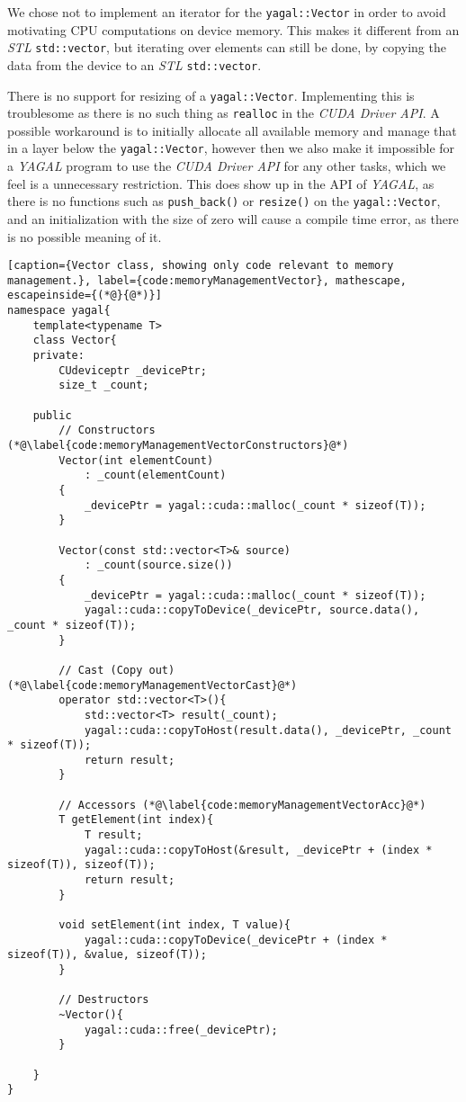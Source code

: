 We chose not to implement an iterator for the \texttt{yagal::Vector} in order to avoid motivating CPU computations on device memory. This makes it different from an \textit{STL} \texttt{std::vector}, but iterating over elements can still be done, by copying the data from the device to an \textit{STL} \texttt{std::vector}.

There is no support for resizing of a \texttt{yagal::Vector}. Implementing this is troublesome as there is no such thing as \texttt{realloc} in the \textit{CUDA Driver API}. A possible workaround is to initially allocate all available memory and manage that in a layer below the \texttt{yagal::Vector}, however then we also make it impossible for a \textit{YAGAL} program to use the \textit{CUDA Driver API} for any other tasks, which we feel is a unnecessary restriction. This does show up in the API of \textit{YAGAL}, as there is no functions such as \texttt{push\_back()} or \texttt{resize()} on the \texttt{yagal::Vector}, and an initialization with the size of zero will cause a compile time error, as there is no possible meaning of it.

\begin{lstlisting}[caption={Vector class, showing only code relevant to memory management.}, label={code:memoryManagementVector}, mathescape, escapeinside={(*@}{@*)}]
namespace yagal{
    template<typename T>
    class Vector{
    private:
        CUdeviceptr _devicePtr;
        size_t _count;

    public
        // Constructors (*@\label{code:memoryManagementVectorConstructors}@*)
        Vector(int elementCount)
            : _count(elementCount)
        {
            _devicePtr = yagal::cuda::malloc(_count * sizeof(T));
        }

        Vector(const std::vector<T>& source)
            : _count(source.size())
        {
            _devicePtr = yagal::cuda::malloc(_count * sizeof(T));
            yagal::cuda::copyToDevice(_devicePtr, source.data(), _count * sizeof(T));
        }

        // Cast (Copy out) (*@\label{code:memoryManagementVectorCast}@*)
        operator std::vector<T>(){
            std::vector<T> result(_count);
            yagal::cuda::copyToHost(result.data(), _devicePtr, _count * sizeof(T));
            return result;
        }

        // Accessors (*@\label{code:memoryManagementVectorAcc}@*)
        T getElement(int index){
            T result;
            yagal::cuda::copyToHost(&result, _devicePtr + (index * sizeof(T)), sizeof(T));
            return result;
        }

        void setElement(int index, T value){
            yagal::cuda::copyToDevice(_devicePtr + (index * sizeof(T)), &value, sizeof(T));
        }

        // Destructors
        ~Vector(){
            yagal::cuda::free(_devicePtr);
        }

    }
}
\end{lstlisting}